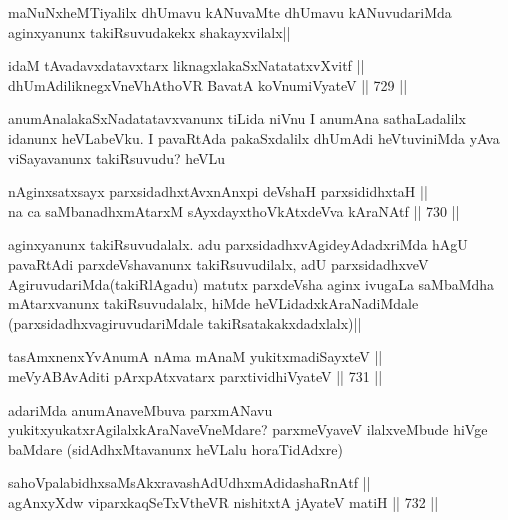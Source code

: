 \begin{artha}
maNuNxheMTiyalilx dhUmavu kANuvaMte dhUmavu kANuvudariMda aginxyanunx takiRsuvudakekx  shakayxvilalx||
\end{artha}

\begin{shl}
idaM tAvadavxdatavxtarx liknagxlakaSxNatatatxvXvitf || \\
dhUmAdiliknegxVneVhAthoVR BavatA koV\s numiVyateV ||  729 ||  
\end{shl}

\begin{artha}
anumAnalakaSxNadatatavxvanunx tiLida niVnu  I anumAna sathaLadalilx idanunx heVLabeVku. I pavaRtAda pakaSxdalilx dhUmAdi heVtuviniMda yAva viSayavanunx takiRsuvudu? heVLu
\end{artha}

\begin{shl}
nAginxsatxsayx parxsidadhxtAvxnAnxpi deVshaH parxsididhxtaH || \\
na ca saMbanadhxmAtarxM sAyxdayxthoVkAtxdeVva kAraNAtf ||  730 ||  
\end{shl}

\begin{artha}
aginxyanunx takiRsuvudalalx. adu parxsidadhxvAgideyAdadxriMda hAgU pavaRtAdi parxdeVshavanunx takiRsuvudilalx, adU parxsidadhxveV AgiruvudariMda(takiRlAgadu) matutx parxdeVsha aginx ivugaLa saMbaMdha mAtarxvanunx takiRsuvudalalx, hiMde heVLidadxkAraNadiMdale (parxsidadhxvagiruvudariMdale takiRsatakakxdadxlalx)||
\end{artha}


\begin{shl}
tasAmxnenxYvAnumA nAma mAnaM yukitxmadiSayxteV || \\
meVyABAvAditi pArxpAtxvatarx parxtividhiVyateV ||  731 ||  
\end{shl}

\begin{artha}
adariMda anumAnaveMbuva parxmANavu yukitxyukatxrAgilalxkAraNaveVneMdare? parxmeVyaveV ilalxveMbude hiVge baMdare (sidAdhxMtavanunx heVLalu horaTidAdxre)
\end{artha}


\begin{shl}
sahoVpalabidhxsaMsAkxravashAdUdhxmAdidashaRnAtf ||  \\
agAnxyXdw viparxkaqSeTxV\s theVR nishitxtA jAyateV matiH ||  732 ||  
\end{shl}


